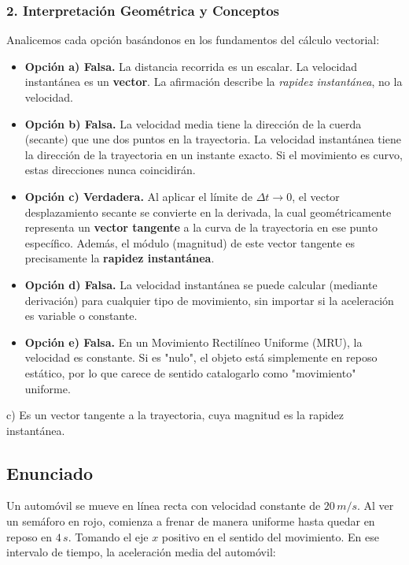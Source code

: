 \documentclass[12pt, a4paper]{article}
\begin{document}
\subsubsection*{2. Interpretación Geométrica y Conceptos}
Analicemos cada opción basándonos en los fundamentos del cálculo vectorial:

\begin{itemize}
    \item \textbf{Opción a) Falsa.} La distancia recorrida es un escalar. La velocidad instantánea es un \textbf{vector}. La afirmación describe la \textit{rapidez instantánea}, no la velocidad.
    \item \textbf{Opción b) Falsa.} La velocidad media tiene la dirección de la cuerda (secante) que une dos puntos en la trayectoria. La velocidad instantánea tiene la dirección de la trayectoria en un instante exacto. Si el movimiento es curvo, estas direcciones nunca coincidirán.
    \item \textbf{Opción c) Verdadera.} Al aplicar el límite de $\Delta t \to 0$, el vector desplazamiento secante se convierte en la derivada, la cual geométricamente representa un \textbf{vector tangente} a la curva de la trayectoria en ese punto específico. Además, el módulo (magnitud) de este vector tangente es precisamente la \textbf{rapidez instantánea}.
    \item \textbf{Opción d) Falsa.} La velocidad instantánea se puede calcular (mediante derivación) para cualquier tipo de movimiento, sin importar si la aceleración es variable o constante.
    \item \textbf{Opción e) Falsa.} En un Movimiento Rectilíneo Uniforme (MRU), la velocidad es constante. Si es "nulo", el objeto está simplemente en reposo estático, por lo que carece de sentido catalogarlo como "movimiento" uniforme.
\end{itemize}

\begin{tcolorbox}[colback=green!5!white, colframe=green!50!black, title=Respuesta Final]
\centering \Large c) Es un vector tangente a la trayectoria, cuya magnitud es la rapidez instantánea.
\end{tcolorbox}

\newpage

\subsection*{Enunciado}
Un automóvil se mueve en línea recta con velocidad constante de $20 \, \si{m/s}$. Al ver un semáforo en rojo, comienza a frenar de manera uniforme hasta quedar en reposo en $4 \, \si{s}$. Tomando el eje $x$ positivo en el sentido del movimiento. En ese intervalo de tiempo, la aceleración media del automóvil:
\end{document}
